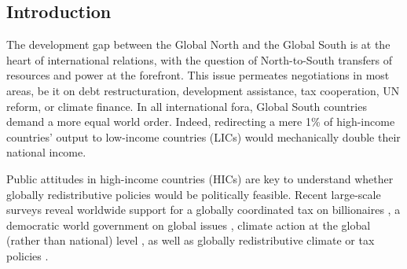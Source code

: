 \documentclass[12pt,english]{article}
\begin{document}

\clearpage
\tableofcontents

\onehalfspacing %

\begin{bibunit}


\section{Introduction}\label{sec:intro}%

The development gap between the Global North and the Global South is at the heart of international relations, with the question of North-to-South transfers of resources and power 
at the forefront. This issue permeates negotiations in most areas, be it on debt restructuration, development assistance, tax cooperation, UN reform, or climate finance. %
In all international fora, Global South countries demand a more equal world order. Indeed, redirecting a mere 1\% of high-income countries' output to low-income countries (LICs) would mechanically double their national income. %

Public attitudes in high-income countries (HICs) are key to understand whether globally redistributive policies would be politically feasible. 
Recent large-scale surveys reveal worldwide 
support for a globally coordinated tax on billionaires \citep{cappelen_majority_2025}, %
a democratic world government on global issues \citep{ghassim_who_2024}, climate action at the global (rather than national) level \citep{dechezlepretre_fighting_2025}, %
as well as globally redistributive climate or tax policies \citep{fabre_majority_2025}. 


\end{bibunit}
\end{document}
